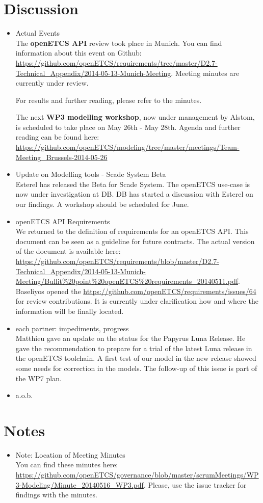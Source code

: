 \documentclass[a4paper, 11pt]{article}
\begin{document}
\section{Discussion}
\begin{itemize}
\item Actual Events\\
The \textbf{openETCS API} review took place in Munich. You can find information about this event on Github: \url{https://github.com/openETCS/requirements/tree/master/D2.7-Technical_Appendix/2014-05-13-Munich-Meeting}. Meeting minutes are currently under review.

For results and further reading, please refer to the minutes.

The next \textbf{WP3 modelling workshop}, now under management by Alstom, is  scheduled to take place on May 26th - May 28th. Agenda and further reading can be found here: \url{https://github.com/openETCS/modeling/tree/master/meetings/Team-Meeting_Brussels-2014-05-26}

\item Update on Modelling tools - Scade System Beta\\
Esterel has released the Beta for Scade System. The openETCS use-case is now under investigation at DB. DB has started a discussion with Esterel on our findings. A workshop should be scheduled for June.

\item openETCS API Requirements\\
We returned to the definition of requirements for an openETCS API. This document can be seen as a guideline for future contracts. The actual version of the document is available here: \url{https://github.com/openETCS/requirements/blob/master/D2.7-Technical_Appendix/2014-05-13-Munich-Meeting/Bullit%20point%20openETCS%20requirements_20140511.pdf}. Baseliyos opened the \url{https://github.com/openETCS/requirements/issues/64} for review contributions. It is currently under clarification how and where the information will be finally located.

\item each partner: impediments, progress\\
Matthieu gave an update on the status for the Papyrus Luna Release.
He gave the recommendation to prepare for a trial of the latest Luna release in the openETCS toolchain. A first test of our model in the new release showed some needs for correction in the models. The follow-up of this issue is part of the WP7 plan.

\item a.o.b.\\

\end{itemize}

\section{Notes}
\begin{itemize}

\item Note: Location of Meeting Minutes\\
You can find these minutes here: \url{https://github.com/openETCS/governance/blob/master/scrumMeetings/WP3-Modeling/Minute_20140516_WP3.pdf}. Please, use the issue tracker for findings with the minutes.

\end{itemize}
\end{document}
